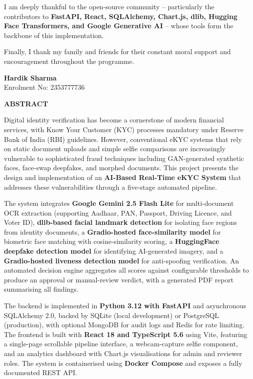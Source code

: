 \documentclass[12pt,a4paper]{report}
\begin{document}
I am deeply thankful to the open-source community -- particularly the contributors to \textbf{FastAPI, React, SQLAlchemy, Chart.js, dlib, Hugging Face Transformers, and Google Generative AI} -- whose tools form the backbone of this implementation.

Finally, I thank my family and friends for their constant moral support and encouragement throughout the programme.

\vspace{2cm}
\begin{flushleft}
\textbf{Hardik Sharma}\\
Enrolment No: 2353777736
\end{flushleft}

\newpage
\thispagestyle{empty}
\begin{center}
    {\Large \textbf{ABSTRACT}}
\end{center}
\vspace{0.5cm}

Digital identity verification has become a cornerstone of modern financial services, with Know Your Customer (KYC) processes mandatory under Reserve Bank of India (RBI) guidelines. However, conventional eKYC systems that rely on static document uploads and simple selfie comparisons are increasingly vulnerable to sophisticated fraud techniques including GAN-generated synthetic faces, face-swap deepfakes, and morphed documents. This project presents the design and implementation of an \textbf{AI-Based Real-Time eKYC System} that addresses these vulnerabilities through a five-stage automated pipeline.

The system integrates \textbf{Google Gemini 2.5 Flash Lite} for multi-document OCR extraction (supporting Aadhaar, PAN, Passport, Driving Licence, and Voter ID), \textbf{dlib-based facial landmark detection} for isolating face regions from identity documents, a \textbf{Gradio-hosted face-similarity model} for biometric face matching with cosine-similarity scoring, a \textbf{HuggingFace deepfake detection model} for identifying AI-generated imagery, and a \textbf{Gradio-hosted liveness detection model} for anti-spoofing verification. An automated decision engine aggregates all scores against configurable thresholds to produce an approval or manual-review verdict, with a generated PDF report summarising all findings.

The backend is implemented in \textbf{Python 3.12 with FastAPI} and asynchronous SQLAlchemy 2.0, backed by SQLite (local development) or PostgreSQL (production), with optional MongoDB for audit logs and Redis for rate limiting. The frontend is built with \textbf{React 18 and TypeScript 5.6} using Vite, featuring a single-page scrollable pipeline interface, a webcam-capture selfie component, and an analytics dashboard with Chart.js visualisations for admin and reviewer roles. The system is containerised using \textbf{Docker Compose} and exposes a fully documented REST API.
\end{document}
